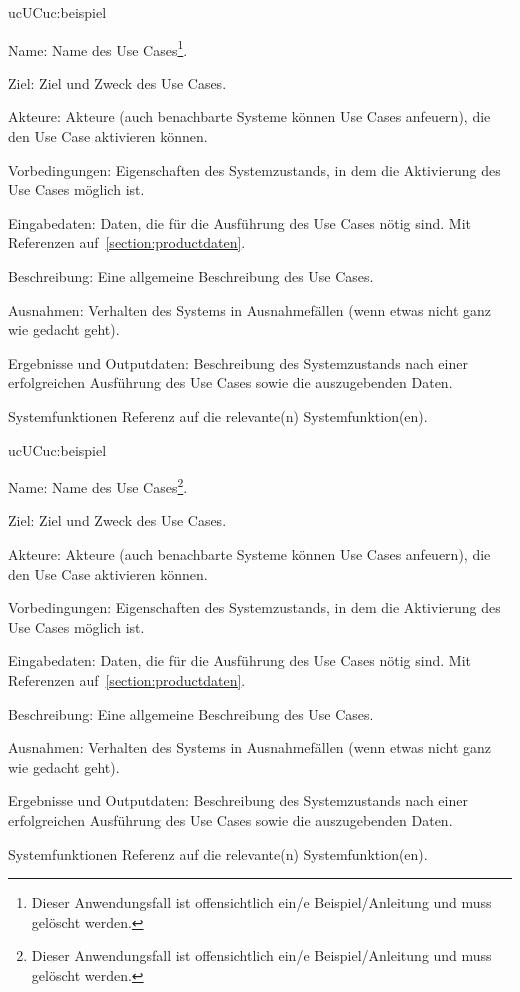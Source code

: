 \begin{description}[leftmargin=5em, style=sameline]

	\begin{lhp}{uc}{UC}{uc:beispiel}
		\item [Name:] Name des Use Cases\footnote{Dieser Anwendungsfall ist offensichtlich ein/e Beispiel/Anleitung und muss gelöscht werden.}.
		\item [Ziel:] Ziel und Zweck des Use Cases.
		\item [Akteure:] Akteure (auch benachbarte Systeme können Use Cases anfeuern), die den Use Case aktivieren können.
		\item [Vorbedingungen:] Eigenschaften des Systemzustands, in dem die Aktivierung des Use Cases möglich ist.
		\item [Eingabedaten:] Daten, die für die Ausführung des Use Cases nötig sind. Mit Referenzen auf~\ref{section:productdaten}.
		\item [Beschreibung:] Eine allgemeine Beschreibung des Use Cases.
		\item [Ausnahmen:] Verhalten des Systems in Ausnahmefällen (wenn etwas nicht ganz wie gedacht geht).
		\item [Ergebnisse und Outputdaten:] Beschreibung des Systemzustands nach einer erfolgreichen Ausführung des Use Cases sowie die auszugebenden Daten.
		\item [Systemfunktionen] Referenz auf die relevante(n) Systemfunktion(en).
	\end{lhp}
	\begin{lhp}{uc}{UC}{uc:beispiel}
		\item [Name:] Name des Use Cases\footnote{Dieser Anwendungsfall ist offensichtlich ein/e Beispiel/Anleitung und muss gelöscht werden.}.
		\item [Ziel:] Ziel und Zweck des Use Cases.
		\item [Akteure:] Akteure (auch benachbarte Systeme können Use Cases anfeuern), die den Use Case aktivieren können.
		\item [Vorbedingungen:] Eigenschaften des Systemzustands, in dem die Aktivierung des Use Cases möglich ist.
		\item [Eingabedaten:] Daten, die für die Ausführung des Use Cases nötig sind. Mit Referenzen auf~\ref{section:productdaten}.
		\item [Beschreibung:] Eine allgemeine Beschreibung des Use Cases.
		\item [Ausnahmen:] Verhalten des Systems in Ausnahmefällen (wenn etwas nicht ganz wie gedacht geht).
		\item [Ergebnisse und Outputdaten:] Beschreibung des Systemzustands nach einer erfolgreichen Ausführung des Use Cases sowie die auszugebenden Daten.
		\item [Systemfunktionen] Referenz auf die relevante(n) Systemfunktion(en).
	\end{lhp}
	

\end{description}
